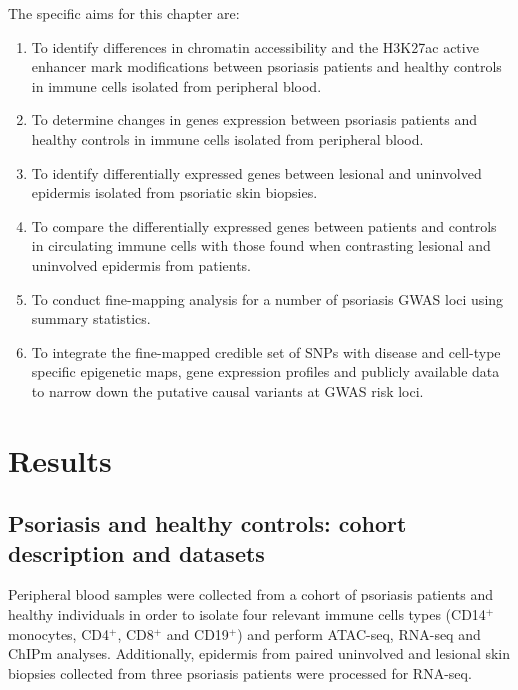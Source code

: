 The specific aims for this chapter are:

\begin{enumerate}
\item To identify differences in chromatin accessibility and the H3K27ac active enhancer mark modifications between psoriasis patients and healthy controls in immune cells isolated from peripheral blood.
\item To determine changes in genes expression between psoriasis patients and healthy controls in immune cells isolated from peripheral blood.
\item To identify differentially expressed genes between lesional and uninvolved epidermis isolated from psoriatic skin biopsies. 
\item To compare the differentially expressed genes between patients and controls  in circulating immune cells with those found when contrasting lesional and uninvolved epidermis from patients. 
\item To conduct fine-mapping analysis for a number of psoriasis GWAS loci using summary statistics.
\item To integrate the fine-mapped credible set of SNPs with disease and cell-type specific epigenetic maps, gene expression profiles and publicly available data to narrow down the putative causal variants at GWAS risk loci.
\end{enumerate}


\section{Results}
\subsection{Psoriasis and healthy controls: cohort description and datasets}
Peripheral blood samples were collected from a cohort of psoriasis patients and healthy individuals in order to isolate four relevant immune cells types (CD14$^+$ monocytes, CD4$^+$, CD8$^+$ and CD19$^+$) and perform ATAC-seq, RNA-seq and ChIPm analyses. Additionally, epidermis from paired uninvolved and lesional skin biopsies collected from three psoriasis patients were processed for RNA-seq.



